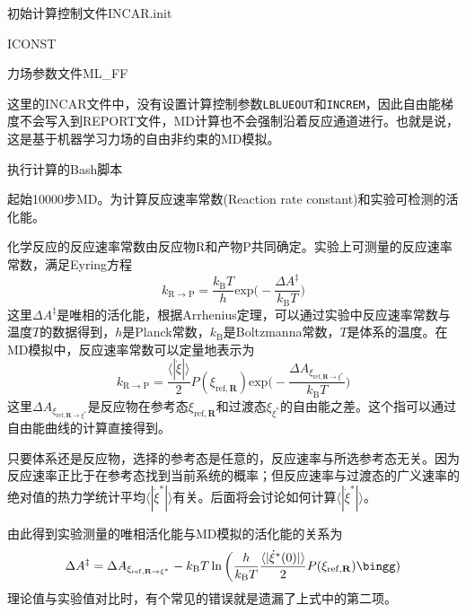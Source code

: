 初始计算控制文件\textrm{INCAR.init}

\textrm{ICONST}

力场参数文件\textrm{ML\_FF}

这里的\textrm{INCAR}文件中，没有设置计算控制参数\texttt{LBLUEOUT}和\texttt{INCREM}，因此自由能梯度不会写入到\textrm{REPORT}文件，\textrm{MD}计算也不会强制沿着反应通道进行。也就是说，这是基于机器学习力场的自由非约束的\textrm{MD}模拟。

执行计算的\textrm{Bash}脚本

起始10000步\textrm{MD}。为计算反应速率常数\textrm{(Reaction rate constant)}和实验可检测的活化能。

化学反应的反应速率常数由反应物\textrm{R}和产物\textrm{P}共同确定。实验上可测量的反应速率常数，满足\textrm{Eyring}方程
\begin{displaymath}
	k_{\mathrm{R}\rightarrow\mathrm{P}}=\dfrac{k_{\mathrm{B}}T}h\mathrm{exp}\bigg(-\dfrac{\Delta A^{\ddagger}}{k_{\mathrm{B}}T}\bigg)
\end{displaymath}
这里$\Delta A^{\ddagger}$是唯相的活化能，根据\textrm{Arrhenius}定理，可以通过实验中反应速率常数与温度$T$的数据得到，$h$是\textrm{Planck}常数，$k_{\mathrm{B}}$是\textrm{Boltzmanna}常数，$T$是体系的温度。在\textrm{MD}模拟中，反应速率常数可以定量地表示为
\begin{displaymath}
	k_{\mathrm{R}\rightarrow\mathrm{P}}=\dfrac{\langle|\dot\xi|\rangle}2P(\xi_{\mathrm{ref},\mathbf{R}})\mathrm{exp}\bigg(-\dfrac{\Delta A_{\xi_{\mathrm{ref},\mathbf{R}\rightarrow\xi^{\ast}}}}{k_{\mathrm{B}}T}\bigg)
\end{displaymath}
这里$\Delta A_{\xi_{\mathrm{ref},\mathbf{R}\rightarrow\xi^{\ast}}}$是反应物在参考态$\xi_{\mathrm{ref},\mathbf{R}}$和过渡态$\xi_{\xi^{\ast}}$的自由能之差。这个指可以通过自由能曲线的计算直接得到。

只要体系还是反应物，选择的参考态是任意的，反应速率与所选参考态无关。因为反应速率正比于在参考态找到当前系统的概率；但反应速率与过渡态的广义速率的绝对值的热力学统计平均$\langle|\dot{\xi}^{\ast}|\rangle$有关。后面将会讨论如何计算$\langle|\dot{\xi}^{\ast}|\rangle$。

由此得到实验测量的唯相活化能与\textrm{MD}模拟的活化能的关系为
\begin{displaymath}
	\Delta A^{\ddagger}=\Delta A_{\xi_{\mathrm{ref},\mathbf{R}\rightarrow\xi^{\ast}}}-k_{\mathrm{B}}T\ln\bigg(\dfrac{h}{k_{\mathrm{B}}T}\dfrac{\langle|\dot{\xi}^{\ast}(0)|\rangle}2P(\xi_{\mathrm{ref},\mathbf{R}})\bingg)
\end{displaymath}
理论值与实验值对比时，有个常见的错误就是遗漏了上式中的第二项。

